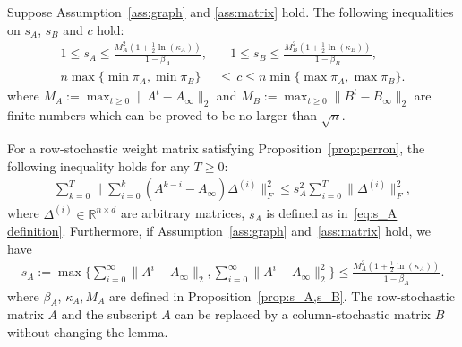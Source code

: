\documentclass[10pt,a4paper]{amsart}
\newcommand{\RR}{\mathbb{R}}
\newcommand{\norm}[1]{\| #1 \|}
\begin{document}
\begin{proposition}\label{prop:s_A,s_B}
Suppose Assumption~\ref{ass:graph} and \ref{ass:matrix} hold.
The following inequalities on $s_A$, $s_B$ and $c$ hold:
    \begin{align*}
    1\le s_A\le \frac{M_A^2(1+\frac{1}{2}\ln(\kappa_A))}{1-\beta_A},&\quad 1\le s_B \le \frac{M_B^2(1+\frac{1}{2}\ln(\kappa_B))}{1-\beta_B},\\
    n\max\{\min \pi_A, \min \pi_B\}&\le  \,c \le n\min\{\max \pi_A, \max \pi_B\}. 
\end{align*}
where \( M_A := \max_{t \ge 0} \|A^t - A_\infty\|_2 \) and \( M_B := \max_{t \ge 0} \|B^t - B_\infty\|_2 \) are finite numbers which can be proved to be no larger than $\sqrt{n}$. 
\end{proposition}

\begin{lemma}\label{lem:rolling sum}
For a row-stochastic weight matrix satisfying Proposition~\ref{prop:perron}, the following inequality holds for any $ T\ge 0$:
    \begin{align}\label{eq:rolling sum A}
    \sum_{k=0}^T\norm{\sum_{i=0}^k(A^{k-i}-A_\infty)\Delta^{(i)}}_F^2\leq s_A^2\sum_{i=0}^T\norm{\Delta^{(i)}}_F^2,
    \end{align}
    where $\Delta^{(i)}\in \RR^{n\times d}$ are arbitrary matrices, $s_A$ is defined as in~\eqref{eq:s_A definition}. Furthermore, if Assumption~\ref{ass:graph} and~\ref{ass:matrix} hold, we have
    \begin{align*}
        s_A:= \max\{\sum_{i= 0}^\infty\norm{A^i-A_\infty}_2, \sum_{i= 0}^\infty\norm{A^i-A_\infty}_2^2\}\le \frac{M_A^2(1+\frac{1}{2}\ln(\kappa_A))}{1-\beta_A}.
    \end{align*} 
     where $\beta_A$, $\kappa_A, M_A$ are defined in Proposition~\ref{prop:s_A,s_B}. The row-stochastic matrix \(A\) and the subscript $A$ can be replaced by a column-stochastic matrix \(B\) without changing the lemma.
\end{lemma}
\end{document}

